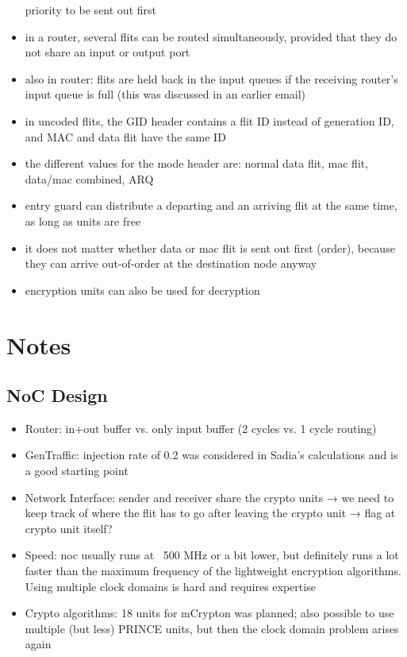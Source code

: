 \documentclass[
	paper=a4,
	fontsize=11pt,
	parskip=full %
]{scrreprt}
\begin{document}
\begin{itemize}
            priority to be sent out first
        \item in a router, several flits can be routed simultaneously, provided that
            they do not share an input or output port
        \item also in router: flits are held back in the input queues if the
            receiving router's input queue is full (this was discussed in an earlier
            email)
        \item in uncoded flits, the GID header contains a flit ID instead of
            generation ID, and MAC and data flit have the same ID
        \item the different values for the mode header are: normal data flit, mac
            flit, data/mac combined, ARQ
        \item entry guard can distribute a departing and an arriving flit at the same
            time, as long as units are free
        \item it does not matter whether data or mac flit is sent out first (order),
            because they can arrive out-of-order at the destination node anyway
        \item encryption units can also be used for decryption
    \end{itemize}

    \chapter{Notes}
    \section{NoC Design}
    \begin{itemize}
        \item Router: in+out buffer vs. only input buffer (2 cycles vs. 1 cycle routing)
        \item GenTraffic: injection rate of 0.2 was considered in Sadia's calculations and is a good starting point
        \item Network Interface: sender and receiver share the crypto units → we need to keep track of where the flit has to go after leaving the crypto unit → flag at crypto unit itself?
        \item Speed: \gls{noc} usually runs at ~500 MHz or a bit lower, but definitely runs a lot faster than the maximum frequency of the lightweight encryption algorithms. Using multiple clock domains is hard and requires expertise
        \item Crypto algorithms: 18 units for mCrypton was planned; also possible to use multiple (but less) PRINCE units, but then the clock domain problem arises again
    \end{itemize}

    \glsaddall %
    \printglossaries
	
    \printbibliography[heading=bibintoc]
\end{document}
